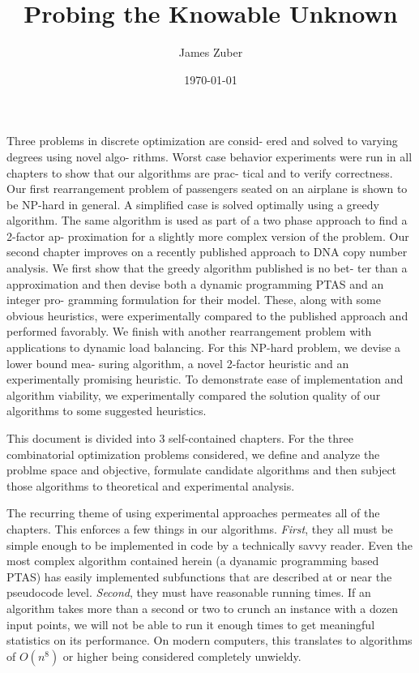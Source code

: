 \documentclass[11pt]{article}
\title{Probing the Knowable Unknown}
\author{James Zuber}
\date{\today}
\begin{document}
\maketitle


Three problems in discrete optimization are consid-
ered and solved to varying degrees using novel algo-
rithms. Worst case behavior experiments were run
in all chapters to show that our algorithms are prac-
tical and to verify correctness.
Our first rearrangement problem of passengers
seated on an airplane is shown to be NP-hard in
general. A simplified case is solved optimally using
a greedy algorithm. The same algorithm is used as
part of a two phase approach to find a 2-factor ap-
proximation for a slightly more complex version of
the problem.
Our second chapter improves on a recently published
approach to DNA copy number analysis. We first
show that the greedy algorithm published is no bet-
ter than a approximation and then devise both a
dynamic programming PTAS and an integer pro-
gramming formulation for their model. These, along
with some obvious heuristics, were experimentally
compared to the published approach and performed
favorably.
We finish with another rearrangement problem with
applications to dynamic load balancing. For this
NP-hard problem, we devise a lower bound mea-
suring algorithm, a novel 2-factor heuristic and an
experimentally promising heuristic. To demonstrate
ease of implementation and algorithm viability, we
experimentally compared the solution quality of our
algorithms to some suggested heuristics.


This document is divided into 3 self-contained chapters.  For the three combinatorial optimization problems considered, we define and analyze the problme space and objective, formulate candidate algorithms and then subject those algorithms to theoretical and experimental analysis.

The recurring theme of using experimental approaches permeates all of the chapters.  This enforces a few things in our algorithms. {\it First}, they all must be simple enough to be implemented in code by a technically savvy reader.  Even the most complex algorithm contained herein (a dyanamic programming based PTAS) has easily implemented subfunctions that are described at or near the pseudocode level.  {\it Second}, they must have reasonable running times.  If an algorithm takes more than a second or two to crunch an instance with a dozen input points, we will not be able to run it enough times to get meaningful statistics on its performance.  On modern computers, this translates to algorithms of $O(n^8)$ or higher being considered completely unwieldy.
\end{document}
